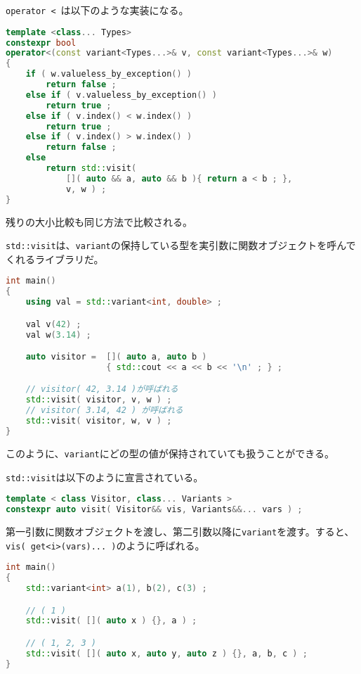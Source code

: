 \lstinline!operator <!~は以下のような実装になる。

\begin{lstlisting}[language=C++]
template <class... Types>
constexpr bool 
operator<(const variant<Types...>& v, const variant<Types...>& w)
{
    if ( w.valueless_by_exception() )
        return false ;
    else if ( v.valueless_by_exception() )
        return true ;
    else if ( v.index() < w.index() )
        return true ;
    else if ( v.index() > w.index() )
        return false ;
    else
        return std::visit( 
            []( auto && a, auto && b ){ return a < b ; },
            v, w ) ;
}
\end{lstlisting}

残りの大小比較も同じ方法で比較される。

%

\lstinline!std::visit!は、\lstinline!variant!の保持している型を実引数に関数オブジェクトを呼んでくれるライブラリだ。

\begin{lstlisting}[language=C++]
int main()
{
    using val = std::variant<int, double> ;

    val v(42) ;
    val w(3.14) ;

    auto visitor =  []( auto a, auto b ) 
                    { std::cout << a << b << '\n' ; } ;

    // visitor( 42, 3.14 )が呼ばれる
    std::visit( visitor, v, w ) ;
    // visitor( 3.14, 42 ) が呼ばれる
    std::visit( visitor, w, v ) ;
}
\end{lstlisting}

このように、\lstinline!variant!にどの型の値が保持されていても扱うことができる。

\lstinline!std::visit!は以下のように宣言されている。

\begin{lstlisting}[language=C++]
template < class Visitor, class... Variants >
constexpr auto visit( Visitor&& vis, Variants&&... vars ) ;
\end{lstlisting}

第一引数に関数オブジェクトを渡し、第二引数以降に\lstinline!variant!を渡す。すると、\lstinline!vis( get<i>(vars)... )!のように呼ばれる。

\begin{lstlisting}[language=C++]
int main()
{
    std::variant<int> a(1), b(2), c(3) ;

    // ( 1 ) 
    std::visit( []( auto x ) {}, a ) ;

    // ( 1, 2, 3 )
    std::visit( []( auto x, auto y, auto z ) {}, a, b, c ) ;
}
\end{lstlisting}

